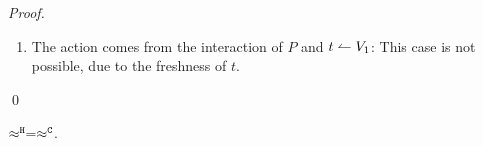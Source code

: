 \begin{proof}
\begin{enumerate}
\begin{enumerate}
				\item The action comes from the interaction of $P$ and $t \leftharpoonup V_1$: This case is not possible, due to the freshness of $t$.
				\end{enumerate}
	\end{enumerate}
	\qed
\end{proof}



\begin{lemma}
	\label{app:lem:wb_eq_wbf}
	$\approx^\mathtt{H} = \approx^\mathtt{C}$.
\end{lemma}

